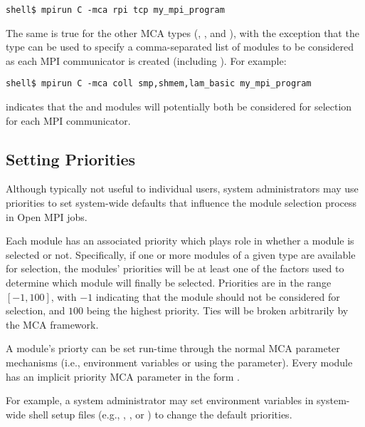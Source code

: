 \lstset{style=lam-cmdline}
\begin{lstlisting}
shell$ mpirun C -mca rpi tcp my_mpi_program
\end{lstlisting}

The same is true for the other MCA types (, , and
), with the exception that the  type can be used
to specify a comma-separated list of modules to be considered as each
MPI communicator is created (including
).  For example:

\lstset{style=lam-cmdline}
\begin{lstlisting}
shell$ mpirun C -mca coll smp,shmem,lam_basic my_mpi_program
\end{lstlisting}

\noindent indicates that the  and 
modules will potentially both be considered for selection for each MPI
communicator.


\subsection{Setting Priorities}

Although typically not useful to individual users, system
administrators may use priorities to set system-wide defaults that
influence the module selection process in Open MPI jobs.

Each module has an associated priority which plays role in whether a
module is selected or not.  Specifically, if one or more modules of a
given type are available for selection, the modules' priorities will
be at least one of the factors used to determine which module will
finally be selected.  Priorities are in the range $[-1, 100]$, with
$-1$ indicating that the module should not be considered for
selection, and $100$ being the highest priority.  Ties will be broken
arbitrarily by the MCA framework.

A module's priorty can be set run-time through the normal MCA
parameter mechanisms (i.e., environment variables or using the
 parameter).  Every module has an implicit priority MCA
parameter in the form .

For example, a system administrator may set environment variables in
system-wide shell setup files (e.g., ,
, or ) to change the default
priorities.  

